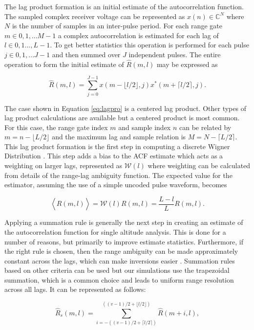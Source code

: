\documentclass[draft,ras]{agutex}
\begin{document}
\begin{article}
The lag product formation is an initial estimate of the autocorrelation function. The sampled complex receiver voltage can be represented as $x(n) \in\mathbb{C}^N$ where $N$ is the number of samples in an inter-pulse period. For each range gate $m\in 0,1,...M-1$ a complex autocorrelation is estimated for each lag of $l \in 0,1...,L-1$.  To get better statistics this operation is performed for each pulse $j\in 0,1,...J-1$ and then summed over $J$ independent pulses. The entire operation to form the initial estimate of $\widehat{R}(m,l)$ may be expressed as

\begin{equation}
\label{eq:lagpro}
\widehat{R}(m,l) = \displaystyle\sum\limits_{j=0}^{J-1} x(m-\lfloor l/2\rfloor,j)x^*(m+\lceil l/2 \rceil,j).
\end{equation}

The case shown in Equation \ref{eq:lagpro} is a centered lag product.  Other types of lag product calculations are available but a centered product is most common. For this case, the range gate index $m$ and sample index $n$ can be related by $m=n-\lfloor L/2\rfloor$ and the maximum lag and sample relation is $M=N-\lceil L/2 \rceil$.  This lag product formation is the first step in computing a discrete Wigner Distribution \citep{TFAcohen}. This  step adds a bias to the ACF estimate which acts as a weighting on larger lags, represented as $\mathcal{W}(l)$ where weighting can be calculated from details of the range-lag ambiguity function. The expected value for the estimator, assuming the use of a simple uncoded pulse waveform, becomes

\begin{equation}
\label{eq:lagprobias}
\left\langle\widehat{R}(m,l) \right\rangle = \mathcal{W}(l)R(m,l) =\frac{L-l}{L}R(m,l).
\end{equation}


Applying a summation rule is generally the next step in creating an estimate of the autocorrelation function for single altitude analysis. This is done for a number of reasons, but primarily to improve estimate statistics.  Furthermore, if the right rule is chosen, then the range ambiguity can be made approximately constant across the lags, which can make inversions easier \citep{nygren1996}. Summation rules based on other criteria can be used but our simulations use the trapezoidal summation, which is a common choice and leads to uniform range resolution across all lags. It can be represented as follows:

\begin{equation}
\label{eq:sumrule}
\widehat{R}_s(m,l) = \displaystyle\sum\limits_{i=-((v-1)/2+\lceil l/2 \rceil)}^{((v-1)/2+\lfloor l/2\rfloor)} \widehat{R}(m+i,l),
\end{equation}


\end{article}
\end{document}
